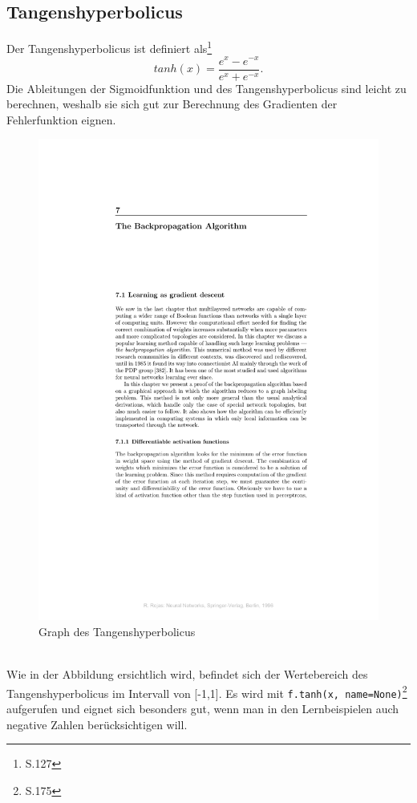 \subsection{Tangenshyperbolicus}
Der Tangenshyperbolicus ist definiert als\footnote{\cite{Bishop1995}S.127}
\begin{equation}
tanh(x)=\frac{e^x - e^{-x}}{e^x + e^{-x}}.
\end{equation}
Die Ableitungen der Sigmoidfunktion und des Tangenshyperbolicus sind leicht zu berechnen, weshalb sie sich gut zur Berechnung des Gradienten der Fehlerfunktion eignen.
\begin{figure}[!htp]
	\includegraphics[page=3,trim = 10.3cm 22cm 5cm 4.7cm,clip=true,scale=1.4]{images/BackPropRojas.pdf}
	\centering
	\caption{Graph des Tangenshyperbolicus \cite{Rojas1996}}
\end{figure}\\
Wie in der Abbildung ersichtlich wird, befindet sich der Wertebereich des Tangenshyperbolicus im Intervall von [-1,1]. Es wird mit \lstinline$f.tanh(x, name=None)$\footnote{\cite{building}S.175} aufgerufen und eignet sich besonders gut, wenn man in den Lernbeispielen auch negative Zahlen berücksichtigen will.
